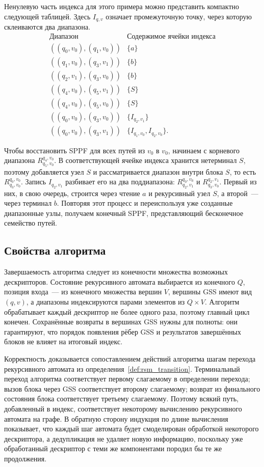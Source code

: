 Ненулевую часть индекса для этого примера можно представить компактно следующей таблицей. Здесь $I_{q,v}$ означает промежуточную точку, через которую склеиваются два диапазона.
\[
\begin{array}{c|l}
    \text{Диапазон} & \text{Содержимое ячейки индекса} \\
    \hline
    ((q_0,v_0),(q_1,v_0)) & \{a\} \\
    ((q_1,v_0),(q_3,v_1)) & \{b\} \\
    ((q_2,v_1),(q_3,v_0)) & \{b\} \\
    ((q_4,v_0),(q_5,v_1)) & \{S\} \\
    ((q_4,v_0),(q_5,v_0)) & \{S\} \\
    ((q_0,v_0),(q_3,v_0)) & \{I_{q_2,v_1}\} \\
    ((q_0,v_0),(q_3,v_1)) & \{I_{q_1,v_0}, I_{q_2,v_0}\}.
\end{array}
\]

Чтобы восстановить SPPF для всех путей из $v_0$ в $v_0$, начинаем с корневого диапазона $R^{q_4,v_0}_{q_5,v_0}$. В соответствующей ячейке индекса хранится нетерминал $S$, поэтому добавляется узел $S$ и рассматривается диапазон внутри блока $S$, то есть $R^{q_0,v_0}_{q_3,v_0}$. Запись $I_{q_2,v_1}$ разбивает его на два поддиапазона: $R^{q_0,v_0}_{q_2,v_1}$ и $R^{q_2,v_1}_{q_3,v_0}$. Первый из них, в свою очередь, строится через чтение $a$ и рекурсивный узел $S$, а второй~--- через терминал $b$. Повторяя этот процесс и переиспользуя уже созданные диапазонные узлы, получаем конечный SPPF, представляющий бесконечное семейство путей.

\subsection{Свойства алгоритма}
\label{subsec:CFPQ_GLL_Properties}

Завершаемость алгоритма следует из конечности множества возможных дескрипторов. Состояние рекурсивного автомата выбирается из конечного $Q$, позиция входа~--- из конечного множества вершин $V$, вершины GSS имеют вид $(q,v)$, а диапазоны индексируются парами элементов из $Q \times V$. Алгоритм обрабатывает каждый дескриптор не более одного раза, поэтому главный цикл конечен. Сохранённые возвраты в вершинах GSS нужны для полноты: они гарантируют, что порядок появления рёбер GSS и результатов завершённых блоков не влияет на итоговый индекс.

Корректность доказывается сопоставлением действий алгоритма шагам перехода рекурсивного автомата из определения~\ref{def:rsm_transition}. Терминальный переход алгоритма соответствует первому слагаемому в определении перехода; вызов блока через GSS соответствует второму слагаемому; возврат из финального состояния блока соответствует третьему слагаемому. Поэтому всякий путь, добавленный в индекс, соответствует некоторому вычислению рекурсивного автомата на графе. В обратную сторону индукция по длине вычисления показывает, что каждый шаг автомата будет смоделирован обработкой некоторого дескриптора, а дедупликация не удаляет новую информацию, поскольку уже обработанный дескриптор с теми же компонентами породил бы те же продолжения.

